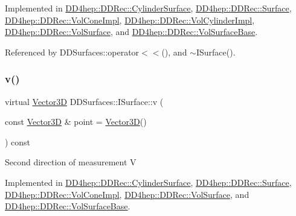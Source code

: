 Implemented in \hyperlink{class_d_d4hep_1_1_d_d_rec_1_1_cylinder_surface_a8b45bcd7d1ca8b8de3d3e5b509988224}{D\+D4hep\+::\+D\+D\+Rec\+::\+Cylinder\+Surface}, \hyperlink{class_d_d4hep_1_1_d_d_rec_1_1_surface_a1b69829495d4a43178222cc7a5b369da}{D\+D4hep\+::\+D\+D\+Rec\+::\+Surface}, \hyperlink{class_d_d4hep_1_1_d_d_rec_1_1_vol_cone_impl_a6e9da4a465f95d8579fb579a7ef1236c}{D\+D4hep\+::\+D\+D\+Rec\+::\+Vol\+Cone\+Impl}, \hyperlink{class_d_d4hep_1_1_d_d_rec_1_1_vol_cylinder_impl_a6dd06a67301fc423f1785c814f73d906}{D\+D4hep\+::\+D\+D\+Rec\+::\+Vol\+Cylinder\+Impl}, \hyperlink{class_d_d4hep_1_1_d_d_rec_1_1_vol_surface_a91c03b8e7e29245a1c955d459b3077ae}{D\+D4hep\+::\+D\+D\+Rec\+::\+Vol\+Surface}, and \hyperlink{class_d_d4hep_1_1_d_d_rec_1_1_vol_surface_base_a4eb22902d5caf992589142a93accc48d}{D\+D4hep\+::\+D\+D\+Rec\+::\+Vol\+Surface\+Base}.



Referenced by D\+D\+Surfaces\+::operator$<$$<$(), and $\sim$\+I\+Surface().

\hypertarget{class_d_d_surfaces_1_1_i_surface_a61c9f2057ea0383b39ead13a147b2838}{}\label{class_d_d_surfaces_1_1_i_surface_a61c9f2057ea0383b39ead13a147b2838} 
\subsubsection{\texorpdfstring{v()}{v()}}
{\footnotesize\ttfamily virtual \hyperlink{class_d_d_surfaces_1_1_vector3_d}{Vector3D} D\+D\+Surfaces\+::\+I\+Surface\+::v (\begin{DoxyParamCaption}\item[{const \hyperlink{class_d_d_surfaces_1_1_vector3_d}{Vector3D} \&}]{point = {\ttfamily \hyperlink{class_d_d_surfaces_1_1_vector3_d}{Vector3D}()} }\end{DoxyParamCaption}) const\hspace{0.3cm}{\ttfamily [pure virtual]}}

Second direction of measurement V 

Implemented in \hyperlink{class_d_d4hep_1_1_d_d_rec_1_1_cylinder_surface_a53dbbe89c9d1306d5cafb5a940b8d77f}{D\+D4hep\+::\+D\+D\+Rec\+::\+Cylinder\+Surface}, \hyperlink{class_d_d4hep_1_1_d_d_rec_1_1_surface_ab2ff33cf97a5d3b516673b31867dd035}{D\+D4hep\+::\+D\+D\+Rec\+::\+Surface}, \hyperlink{class_d_d4hep_1_1_d_d_rec_1_1_vol_cone_impl_a87e96fba8185dccf1422d60a748f5d2f}{D\+D4hep\+::\+D\+D\+Rec\+::\+Vol\+Cone\+Impl}, \hyperlink{class_d_d4hep_1_1_d_d_rec_1_1_vol_surface_a58966cabf7965016fcb63414b64eedd2}{D\+D4hep\+::\+D\+D\+Rec\+::\+Vol\+Surface}, and \hyperlink{class_d_d4hep_1_1_d_d_rec_1_1_vol_surface_base_a94d4f190a803d08a9739fb31a8c6fd2f}{D\+D4hep\+::\+D\+D\+Rec\+::\+Vol\+Surface\+Base}.



